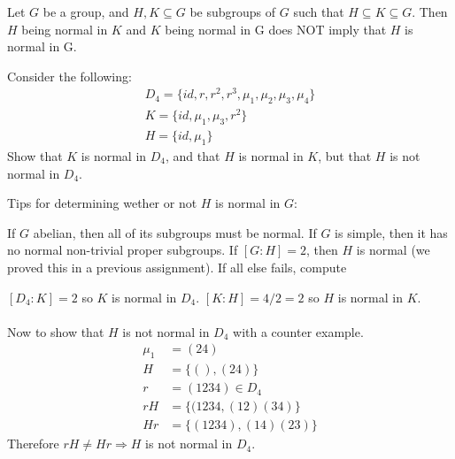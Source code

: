 \documentclass[class=scrartcl, crop=false]{standalone}
\begin{document}
\begin{remark}
  Let $G$ be a group, and $H, K \subseteq G$ be subgroups of $G$ such that $H \subseteq K \subseteq G$. Then $H$ being normal in $K$ and $K$ being normal in G does NOT imply that $H$ is normal in G.
  \begin{example}
    Consider the following:
    \begin{gather*}
      D_4 = \{id, r, r^2, r^3, \mu_1, \mu_2, \mu_3, \mu_4\} \\
      K = \{id, \mu_1, \mu_3, r^2\} \\
      H = \{id, \mu_1\}
    \end{gather*}
    Show that $K$ is normal in $D_4$, and that $H$ is normal in $K$, but that $H$ is not normal in $D_4$.
    \begin{note}
      Tips for determining wether or not $H$ is normal in $G$:
      \begin{enumerate}
        \ii
        If $G$ abelian, then all of its subgroups must be normal.
        \ii
        If $G$ is simple, then it has no normal non-trivial proper subgroups.
        \ii
        If $[G:H] = 2$, then $H$ is normal (we proved this in a previous assignment).
        \ii
        If all else fails, compute
      \end{enumerate}
      $[D_4:K] = 2$ so $K$ is normal in $ D_4$. $[K:H] = 4 / 2 = 2$ so $H$ is normal in $K$.
      \\\\
      Now to show that $H$ is not normal in $D_4$ with a counter example.
      \begin{align*}
        \mu_1 &= (24) \\
        H &= \{(), (24)\} \\
        r &= (1234) \in D_4 \\
        rH &= \{(1234, (12)(34)\} \\
        Hr &= \{(1234), (14)(23)\}
      \end{align*}
      Therefore $rH \neq Hr \Rightarrow H$ is not normal in $D_4$.
    \end{note}
  \end{example}
\end{remark}
\end{document}
